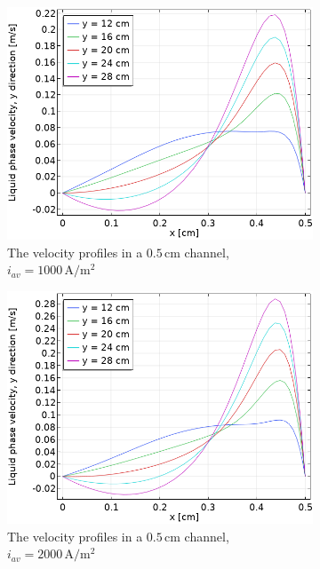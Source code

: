 \begin{figure}
\centering
\begin{subfigure}{.5\textwidth}
  \centering
  \includegraphics[width=1\linewidth]{velocityprofilenosaff5mm1000A.png}
  \caption{The velocity profiles in a $0.5 \, \mathrm{cm}$ channel, $i_{av}=1000 \, \mathrm{A/m^2}$}
\end{subfigure}%
\begin{subfigure}{.5\textwidth}
  \centering
  \includegraphics[width=1\linewidth]{velocityprofilenosaff5mm2000A.png}
  \caption{The velocity profiles in a $0.5 \, \mathrm{cm}$ channel, $i_{av}=2000 \, \mathrm{A/m^2}$}
\end{subfigure}
\begin{subfigure}{.5\textwidth}

\end{subfigure}
\end{figure}
